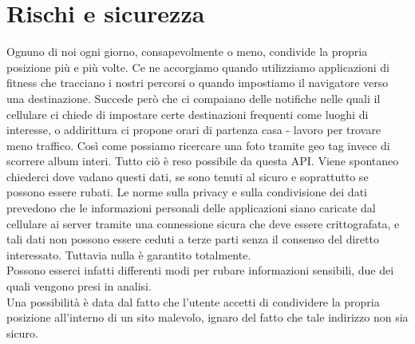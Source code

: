 \documentclass[12pt ,a4paper , twoside , openright ]{book}
\begin{document}
	\section{Rischi e sicurezza} 
	Ognuno di noi ogni giorno, consapevolmente o meno, condivide la propria posizione più e più volte. Ce ne accorgiamo quando utilizziamo applicazioni di fitness che tracciano i nostri percorsi o quando impostiamo il navigatore verso una destinazione. Succede però che ci compaiano delle notifiche nelle quali il cellulare ci chiede di impostare certe destinazioni frequenti come luoghi di interesse, o addirittura ci propone orari di partenza casa - lavoro per trovare meno traffico. Così come possiamo ricercare una foto tramite geo tag invece di scorrere album interi. Tutto ciò è reso possibile da questa API. Viene spontaneo chiederci dove vadano questi dati, se sono tenuti al sicuro e soprattutto se possono essere rubati. Le norme sulla privacy e sulla condivisione dei dati prevedono che le informazioni personali delle applicazioni siano caricate dal cellulare ai server tramite una connessione sicura che deve essere crittografata, e tali dati non possono essere ceduti a terze parti senza il consenso del diretto interessato. Tuttavia nulla è garantito totalmente. \\
	Possono esserci infatti differenti modi per rubare informazioni sensibili, due dei quali vengono presi in analisi. \\
	Una possibilità è data dal fatto che l'utente accetti di condividere la propria posizione all'interno di un sito malevolo, ignaro del fatto che tale indirizzo non sia sicuro. \\
\end{document}
